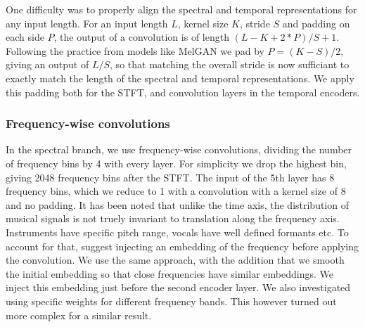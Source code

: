 \documentclass[10pt,a4paper,onecolumn]{article}
\let\origfigure\figure
\let\endorigfigure\endfigure
\renewenvironment{figure}[1][2] {
    \expandafter\origfigure\expandafter[H]
} {
    \endorigfigure
}
\begin{document}
One difficulty was to properly align the spectral and temporal
representations for any input length. For an input length \(L\), kernel
size \(K\), stride \(S\) and padding on each side \(P\), the output of a
convolution is of length \((L - K + 2 * P) / S + 1\). Following the
practice from models like MelGAN \citep{melgan} we pad by
\(P = (K - S) / 2\), giving an output of \(L / S\), so that matching the
overall stride is now sufficiant to exactly match the length of the
spectral and temporal representations. We apply this padding both for
the STFT, and convolution layers in the temporal encoders.

\begin{figure}
\hypertarget{fig:hyb}{%
\centering
\resizebox{\textwidth}{!}{
  
}
\caption{Hybrid Demucs architecture. The input waveform is processed
both through a temporal encoder, and first through the STFT followed by
a spectral encoder. The two representations are summed when their
dimensions align. The decoder is built symmetrically. The output
spectrogram go through the ISTFT and is summed with the waveform
outputs, giving the final model output. The \(\mathrm{Z}\) prefix is
used for spectral layers, and \(\mathrm{T}\) prefix for the temporal
ones.}\label{fig:hyb}
}
\end{figure}

\hypertarget{frequency-wise-convolutions}{%
\subsubsection{Frequency-wise
convolutions}\label{frequency-wise-convolutions}}

In the spectral branch, we use frequency-wise convolutions, dividing the
number of frequency bins by 4 with every layer. For simplicity we drop
the highest bin, giving 2048 frequency bins after the STFT. The input of
the 5th layer has 8 frequency bins, which we reduce to 1 with a
convolution with a kernel size of 8 and no padding. It has been noted
that unlike the time axis, the distribution of musical signals is not
truely invariant to translation along the frequency axis. Instruments
have specific pitch range, vocals have well defined formants etc. To
account for that, \citet{zemb} suggest injecting an embedding of the
frequency before applying the convolution. We use the same approach,
with the addition that we smooth the initial embedding so that close
frequencies have similar embeddings. We inject this embedding just
before the second encoder layer. We also investigated using specific
weights for different frequency bands. This however turned out more
complex for a similar result.
\end{document}
